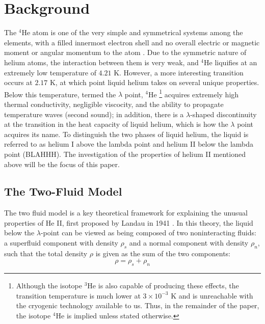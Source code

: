 
\section{Background}\label{background}

The $^4$He atom is one of the very simple and symmetrical systems
among the elements, with a filled innermost electron shell and no
overall electric or magnetic moment or angular momentum to the atom
\cite{atkins}. Due to the symmetric nature of helium atoms, the
interaction between them is very weak, and $^4$He liquifies at an
extremely low temperature of $4.21$ K. However, a more interesting
transition occurs at $2.17$ K, at which point liquid helium takes on
several unique properties. Below this temperature, termed the
$\lambda$ point, $^4$He \footnote{Although the isotope $^3$He is also
  capable of producing these effects, the transition temperature is
  much lower at $3\times 10^{-3}$ K and is unreachable with the
  cryogenic technology available to us. Thus, in the remainder of the
  paper, the isotope $^4$He is implied unless stated otherwise.}
acquires extremely high thermal conductivity, negligible viscocity,
and the ability to propagate temperature waves (second sound); in
addition, there is a $\lambda$-shaped discontinuity at the transition
in the heat capacity of liquid helium, which is how the $\lambda$
point acquires its name. To distinguish the two phases of liquid
helium, the liquid is referred to as helium I above the lambda point
and helium II below the lambda point (BLAHHH). The investigation of
the properties of helium II mentioned above will be the focus of this
paper.

\subsection{The Two-Fluid Model}

The two fluid model is a key theoretical framework for explaining the
unusual properties of He II, first proposed by Landau in 1941
\cite{landau}. In this theory, the liquid below the $\lambda$-point
can be viewed as being composed of two noninteracting fluids: a
superfluid component with density $\rho_s$ and a normal component with
density $\rho_n$, such that the total density $\rho$ is given as the
sum of the two components:
\begin{equation}
\rho = \rho_s + \rho_n
\end{equation}

